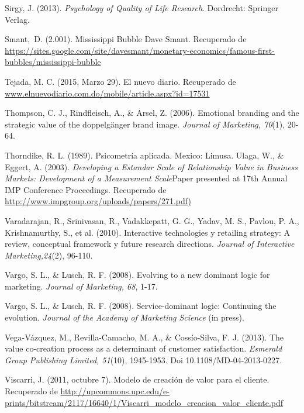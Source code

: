 \begin{thebibliography}{11}
	\bibitem{}
		Sirgy, J. (2013).  \emph{Psychology of Quality of Life Research}. Dordrecht: Springer Verlag. 

	\bibitem{}
		Smant, D. (2.001). Mississippi Bubble Dave Smant. Recuperado de \url{https://sites.google.com/site/davesmant/monetary-economics/famous-first-bubbles/mississippi-bubble}

	\bibitem{}
		Tejada, M. C. (2015, Marzo 29). El nuevo diario. Recuperado de \url{www.elnuevodiario.com.do/mobile/article.aspx?id=17531}

	\bibitem{}
		Thompson, C. J., Rindfleisch, A., \& Arsel, Z. (2006). Emotional branding and the strategic value of the doppelgänger brand image. \emph{Journal of Marketing, 70}(1), 20-64. 

	\bibitem{}
		Thorndike, R. L. (1989). Psicometría aplicada. Mexico: Limusa.
		Ulaga, W., \& Eggert, A. (2003).  \emph{Developing a Estandar Scale of Relationship Value in Business Markets: Development of a Measurement Scale}Paper presented at 17th Annual IMP Conference Proceedings. Recuperado de \url{http://www.impgroup.org/uploads/papers/271.pdf)}

	\bibitem{}
		Varadarajan, R., Srinivasan, R., Vadakkepatt, G. G., Yadav, M. S., Pavlou, P. A., Krishnamurthy, S., et al. (2010). Interactive technologies y retailing strategy: A review, conceptual framework y future research directions. \emph{Journal of Interactive Marketing,24}(2), 96-110.

	\bibitem{}
		Vargo, S. L., \& Lusch, R. F. (2008). Evolving to a new dominant logic for marketing. \emph{Journal of Marketing, 68}, 1-17.

	\bibitem{}
		Vargo, S. L., \& Lusch, R. F. (2008). Service-dominant logic: Continuing the evolution.  \emph{Journal of the Academy of Marketing Science} (in press). 

	\bibitem{}
		Vega-Vázquez, M., Revilla-Camacho, M. A., \& Cossío-Silva, F. J. (2013). The value co-creation process as a determinant of customer satisfaction.  \emph{Esmerald Group Publishing Limited, 51}(10), 1945-1953. Doi 10.1108/MD-04-2013-0227.

	\bibitem{}
		Viscarri, J. (2011, octubre 7). Modelo de creación de valor para el cliente. Recuperado de \url{http://upcommons.upc.edu/e-prints/bitstream/2117/16640/1/Viscarri_modelo_creacion_valor_cliente.pdf} 

	

\end{thebibliography}
